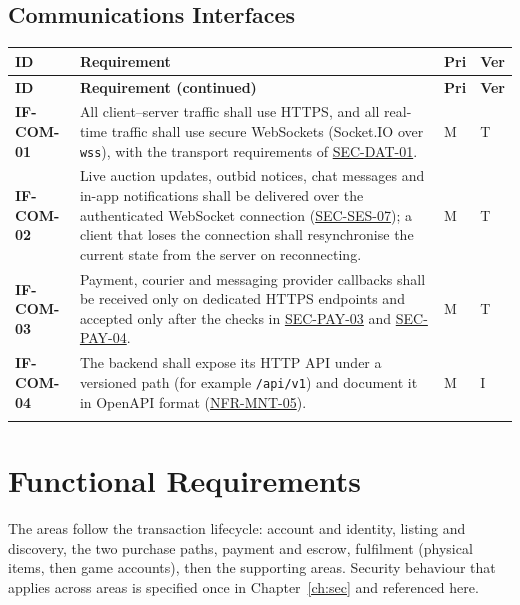 \documentclass[11pt,a4paper]{report}
\makeatletter
\newenvironment{reqs}{%
  \small
  \begin{longtable}{@{}>{\raggedright\arraybackslash}p{2.35cm}
                       >{\raggedright\arraybackslash}p{10.3cm}
                       >{\centering\arraybackslash}p{0.7cm}
                       >{\centering\arraybackslash}p{0.7cm}@{}}
  \toprule
  \textbf{ID} & \textbf{Requirement} & \textbf{Pri} & \textbf{Ver} \\
  \midrule
  \endfirsthead
  \toprule
  \textbf{ID} & \textbf{Requirement (continued)} & \textbf{Pri} & \textbf{Ver} \\
  \midrule
  \endhead
  \bottomrule
  \endfoot
}{\end{longtable}}
\newcommand{\req}[5]{\leavevmode\textbf{#1}\hypertarget{#1}{} & #5 & #2 & #3 \\ \addlinespace[2pt]}
\newcommand{\rr}[1]{\hyperlink{#1}{#1}}
\makeatother
\begin{document}
\section{Communications Interfaces}
\begin{reqs}
\req{IF-COM-01}{M}{T}{new}{All client--server traffic shall use HTTPS, and all real-time traffic shall use secure WebSockets (Socket.IO over \texttt{wss}), with the transport requirements of \rr{SEC-DAT-01}.}
\req{IF-COM-02}{M}{T}{new}{Live auction updates, outbid notices, chat messages and in-app notifications shall be delivered over the authenticated WebSocket connection (\rr{SEC-SES-07}); a client that loses the connection shall resynchronise the current state from the server on reconnecting.}
\req{IF-COM-03}{M}{T}{new}{Payment, courier and messaging provider callbacks shall be received only on dedicated HTTPS endpoints and accepted only after the checks in \rr{SEC-PAY-03} and \rr{SEC-PAY-04}.}
\req{IF-COM-04}{M}{I}{new}{The backend shall expose its HTTP API under a versioned path (for example \texttt{/api/v1}) and document it in OpenAPI format (\rr{NFR-MNT-05}).}
\end{reqs}
\chapter{Functional Requirements}
\label{ch:fr}
The areas follow the transaction lifecycle: account and identity, listing and discovery, the two purchase paths, payment and escrow, fulfilment (physical items, then game accounts), then the supporting areas. Security behaviour that applies across areas is specified once in Chapter~\ref{ch:sec} and referenced here.
\end{document}

